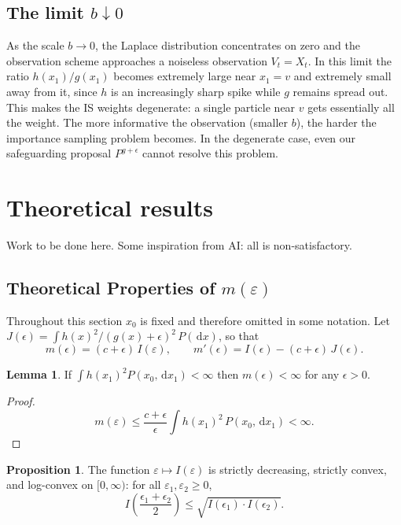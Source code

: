 \documentclass[11pt,reqno]{amsart}
\newcommand{\dd}{{\,\mathrm d}}
\theoremstyle{definition}
\newtheorem{prop}[thm]{Proposition}
\newtheorem{lem}[thm]{Lemma}
\newcommand{\note}[1]{{\color{Sienna} #1}}
\begin{document}
\subsection{The limit $b \downarrow 0$}

As the scale $b \to 0$, the Laplace distribution concentrates on zero and
the observation scheme approaches a noiseless observation $V_t = X_t$. In
this limit the ratio $h(x_1)/g(x_1)$ becomes extremely large near $x_1 = v$
    and extremely small away from it, since $h$ is an increasingly sharp
    spike while $g$ remains spread out. This makes the IS weights
    degenerate: a single particle near $v$ gets essentially all the weight. The more
informative the observation (smaller $b$), the harder the importance sampling problem 
becomes.  In the degenerate case, even our safeguarding proposal $P^{g+\epsilon}$ cannot resolve this problem. 



\section{Theoretical results} \note{Work to be done here. Some inspiration from AI: all is non-satisfactory. }
\subsection{Theoretical Properties of $m(\varepsilon)$}

Throughout this section $x_0$ is fixed and therefore omitted in some notation. Let 
$J(\epsilon) = \int h(x)^2/(g(x)+\epsilon)^2\, P(\dd x)$, so that
\[
  m(\epsilon) = (c+\epsilon)\,I(\varepsilon), \qquad
  m'(\epsilon) = I(\epsilon) - (c+\epsilon)\,J(\epsilon).
\]

\begin{lem}\label{lem:m_eps_finite}
If $\int h(x_1)^2 P(x_0, \dd x_1) <\infty$ then $m(\epsilon)<\infty$ for any $\epsilon>0$.	
\end{lem}
\begin{proof}
	\[
  m(\varepsilon) \leq \frac{c+\epsilon}{\epsilon}\int h(x_1)^2\,P(x_0,\dd x_1) < \infty.
\]
\end{proof}



\begin{prop}
\label{prop:logconvex}
The function $\varepsilon\mapsto I(\varepsilon)$ is strictly decreasing,
strictly convex, and log-convex on $[0,\infty)$: for all
$\varepsilon_1,\varepsilon_2\geq 0$,
\[
  I\!\left(\frac{\epsilon_1+\epsilon_2}{2}\right)
  \leq \sqrt{I(\epsilon_1)\cdot I(\epsilon_2)}.
\]
\end{prop}
\end{document}

